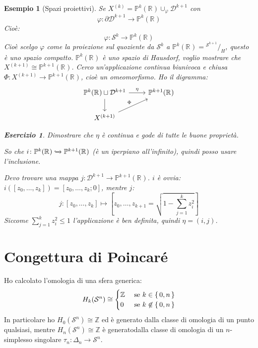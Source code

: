 \documentclass[10pt, twoside=false, x11names]{scrbook}
\newtheorem{example}[theorem]{Esempio}
\newcounter{exercises}
\newtheorem{exercise}[exercises]{Esercizio}
\newcommand{\Z}{\mathbb{Z}}
\newcommand{\RN}[1][]{\mathbb{R}^#1}
\newcommand{\Sph}[1][]{\mathcal{S}^#1}
\newcommand{\Disk}[1][]{\mathcal{D}^#1}
\newcommand{\incl}{\xhookrightarrow{}}
\newcommand*\quot[2]{{^{\textstyle #1}\big/_{\textstyle #2}}}
\let\phi\varphi
\begin{document}
\begin{example}[Spazi proiettivi]
  Se $ X^{(k)} = \mathbb{P}^k(\RN{}) \cup_\phi \Disk{k+1} $ con
  \[
    \phi \colon \partial \Disk{k+1}  \to \mathbb{P}^k(\RN{})
  \]
  Cioè:
  \[
    \phi \colon \Sph{k}  \to \mathbb{P}^k(\RN{})
  \]
  Cioè scelgo $ \phi $ come la proiezione sul quoziente da $ \Sph{k} $ a $ \mathbb{P}^k(\RN{}) = \quot{\Sph{k+1}}{H} $,
  questo è uno spazio compatto.
  $ \mathbb{P}^k(\RN{}) $ è uno spazio di Hausdorf, voglio mostrare che $ X^{(k+1)} \cong \mathbb{P}^{k+1}(\RN{}) $.
  Cerco un'applicazione continua biunivoca e chiusa $ \Phi \colon X^{(k+1)} \to  \mathbb{P}^{k+1}(\RN{}) $,
  cioè un omeomorfismo. Ho il digramma:
  \[
    \begin{tikzcd}
      \mathbb{P}^{k}(\RN{}) \sqcup \Disk{k+1} \arrow{r}{\eta} \arrow{d}{} &  \mathbb{P}^{k+1}(\RN{}) \\
      X^{(k+1)} \arrow{ru}{\Phi}
    \end{tikzcd}
  \]
  \begin{exercise}
    Dimostrare che $ \eta $ è continua e gode di tutte le buone proprietà.
  \end{exercise}
  So che $ i \colon  \mathbb{P}^{k}(\RN{}) \incl \mathbb{P}^{k+1}(\RN{}) $ (è un iperpiano all'infinito),
  quindi posso usare l'inclusione.

  Devo trovare una mappa $ j \colon \Disk{k+1} \to \mathbb{P}^{k+1}(\RN{}) $. $ i $ è ovvia:
  $ i([z_0, \dots, z_k]) = [z_0, \dots, z_k; 0] $, mentre $ j $:
  \[
    j \colon [z_0, \dots, z_k] \mapsto  \left[z_0, \dots, z_{k+1} = \sqrt{1 - \sum_{j=1}^k z_i^2}\right]
  \]
  Siccome $ \sum_{j=1}^k z_i^2 \leq 1 $ l'applicazione è ben definita, quindi $ \eta = (i,j) $.
\end{example}





\section{Congettura di Poincaré}

Ho calcolato l'omologia di una sfera generica:
\[
  H_k(\Sph{n}) \cong
  \begin{cases}
    \Z & \text{ se } k \in \set{0,n} \\
    0 & \text{ se } k \not \in \set{0,n}
  \end{cases}
\]
In particolare ho $ H_0(\Sph{n}) \cong \Z $ ed è generato dalla classe di
omologia di un punto qualsiasi, mentre $ H_n(\Sph{n}) \cong \Z $ è generatodalla
classe di omologia di un $ n $-simplesso singolare $ \tau_n \colon \Delta_n \to \Sph{n} $.
\end{document}
